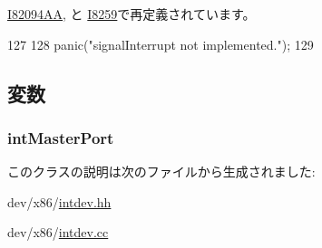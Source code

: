 \hyperlink{classX86ISA_1_1I82094AA_a9d80b13f2832340962ab374bc9a14c4f}{I82094AA}, と \hyperlink{classX86ISA_1_1I8259_a9d80b13f2832340962ab374bc9a14c4f}{I8259}で再定義されています。


\begin{DoxyCode}
127     {
128         panic("signalInterrupt not implemented.\n");
129     }
\end{DoxyCode}


\subsection{変数}
\hypertarget{classX86ISA_1_1IntDevice_a874cd4b6512ae9527310c851890114f5}{
\subsubsection[{intMasterPort}]{ {\bf intMasterPort}}}
\label{classX86ISA_1_1IntDevice_a874cd4b6512ae9527310c851890114f5}


このクラスの説明は次のファイルから生成されました:\begin{DoxyCompactItemize}
\item 
dev/x86/\hyperlink{intdev_8hh}{intdev.hh}\item 
dev/x86/\hyperlink{intdev_8cc}{intdev.cc}\end{DoxyCompactItemize}
